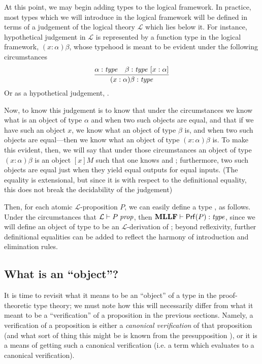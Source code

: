 \documentclass[main.tex]{subfiles}
\begin{document}
At this point, we may begin adding types to the logical framework. In practice,
most types which we will introduce in the logical framework will be defined in
terms of a judgement of the logical theory $\mathcal{L}$ which lies below it.
For instance, hypothetical judgement in $\mathcal{L}$ is represented by a
function type in the logical framework, $(x:\alpha)\beta$, whose typehood is
meant to be evident under the following circumstances
\[
  \infer{
    \type{(x:\alpha)\beta}
  }{
    \type\alpha &
    \lfhyp{\type\beta}{x:\alpha}
  }
\]
Or as a hypothetical judgement,
.

Now, to know this judgement is to know that under the circumstances we know
what is an object of type $\alpha$ and when two such objects are equal, and
that if we have such an object $x$, we know what an object of type $\beta$ is,
and when two such objects are equal---then we know what an object of type
$(x:\alpha)\beta$ is. To make this evident, then, we will say that under those
circumstances an object of type $(x:\alpha)\beta$ is an object $[x]M$ such that
one knows  and ;
furthermore, two such objects are equal just when they yield equal outputs for
equal inputs. (The equality is extensional, but since it is with respect to the
definitional equality, this does not break the decidability of the judgement)

Then, for each atomic $\mathcal{L}$-proposition $P$, we can easily define a
type , as follows. Under the circumstances that
$\mathcal{L}\vdash P\;\mathit{prop}$, then $\textbf{MLLF}\vdash\mathsf{Prf}(P):\mathit{type}$, since we will
define an object of type  to be an $\mathcal{L}$-derivation of
; beyond reflexivity, further definitional equalities can be added to
reflect the harmony of introduction and elimination rules.

\subsection{What is an ``object''?}
It is time to revisit what it means to be an ``object'' of a type in the
proof-theoretic type theory; we must note how this will necessarily differ from
what it meant to be a ``verification'' of a proposition in the previous
sections. Namely, a verification of a proposition is either a \emph{canonical
verification} of that proposition (and what sort of thing this might be is
known from the presupposition ), or it is a means of getting such
a canonical verification (i.e. a term which evaluates to a canonical
verification).
\end{document}
